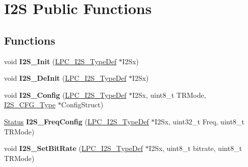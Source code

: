 \hypertarget{group___i2_s___public___functions}{\section{\-I2\-S \-Public \-Functions}
\label{group___i2_s___public___functions}
}
\subsection*{\-Functions}
\begin{DoxyCompactItemize}
\item 
\hypertarget{group___i2_s___public___functions_gacdc31b6e9bf7a0e41b1a9ea128c40523}{void {\bfseries \-I2\-S\-\_\-\-Init} (\hyperlink{struct_l_p_c___i2_s___type_def}{\-L\-P\-C\-\_\-\-I2\-S\-\_\-\-Type\-Def} $\ast$\-I2\-Sx)}\label{group___i2_s___public___functions_gacdc31b6e9bf7a0e41b1a9ea128c40523}

\item 
\hypertarget{group___i2_s___public___functions_gaa26341da6278834f25b37e42d6cf74b9}{void {\bfseries \-I2\-S\-\_\-\-De\-Init} (\hyperlink{struct_l_p_c___i2_s___type_def}{\-L\-P\-C\-\_\-\-I2\-S\-\_\-\-Type\-Def} $\ast$\-I2\-Sx)}\label{group___i2_s___public___functions_gaa26341da6278834f25b37e42d6cf74b9}

\item 
\hypertarget{group___i2_s___public___functions_gaac2cc2aedf139be44049c75615bb6095}{void {\bfseries \-I2\-S\-\_\-\-Config} (\hyperlink{struct_l_p_c___i2_s___type_def}{\-L\-P\-C\-\_\-\-I2\-S\-\_\-\-Type\-Def} $\ast$\-I2\-Sx, uint8\-\_\-t \-T\-R\-Mode, \hyperlink{struct_i2_s___c_f_g___type}{\-I2\-S\-\_\-\-C\-F\-G\-\_\-\-Type} $\ast$\-Config\-Struct)}\label{group___i2_s___public___functions_gaac2cc2aedf139be44049c75615bb6095}

\item 
\hypertarget{group___i2_s___public___functions_gad00f7ddfb6a425919d94966593824317}{\hyperlink{group___l_p_c___types___public___types_ga67a0db04d321a74b7e7fcfd3f1a3f70b}{\-Status} {\bfseries \-I2\-S\-\_\-\-Freq\-Config} (\hyperlink{struct_l_p_c___i2_s___type_def}{\-L\-P\-C\-\_\-\-I2\-S\-\_\-\-Type\-Def} $\ast$\-I2\-Sx, uint32\-\_\-t \-Freq, uint8\-\_\-t \-T\-R\-Mode)}\label{group___i2_s___public___functions_gad00f7ddfb6a425919d94966593824317}

\item 
\hypertarget{group___i2_s___public___functions_gaa7b3ff4f4e0d16299deb2b9e305923e7}{void {\bfseries \-I2\-S\-\_\-\-Set\-Bit\-Rate} (\hyperlink{struct_l_p_c___i2_s___type_def}{\-L\-P\-C\-\_\-\-I2\-S\-\_\-\-Type\-Def} $\ast$\-I2\-Sx, uint8\-\_\-t bitrate, uint8\-\_\-t \-T\-R\-Mode)}\label{group___i2_s___public___functions_gaa7b3ff4f4e0d16299deb2b9e305923e7}


\end{DoxyCompactItemize}
